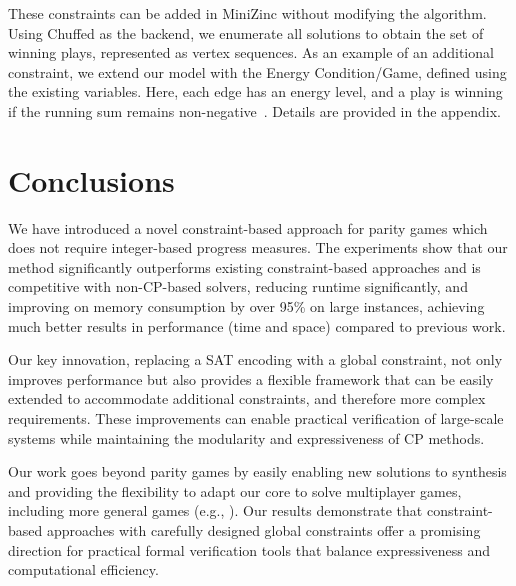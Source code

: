 \documentclass[letterpaper]{article} %
\begin{document}
These constraints can be added in MiniZinc without modifying the \noc algorithm. Using Chuffed as the backend, we enumerate all solutions to obtain the set of winning plays, represented as vertex sequences. As an example of an additional constraint, we extend our model with the Energy Condition/Game, defined using the existing variables. Here, each edge has an energy level, and a play is winning if the running sum remains non-negative~\cite{Chatterjee:2010}. Details are provided in the appendix.

\section{Conclusions}
We have introduced a novel constraint-based approach for parity games which does not require integer-based progress measures. The experiments show that our method significantly outperforms existing constraint-based approaches and is competitive with non-CP-based solvers, reducing runtime significantly, and improving on memory consumption by over 95\% on large instances, achieving much better results in performance (time and space) compared to previous work. 

Our key innovation, replacing a SAT encoding with a global constraint, not only improves performance but also provides a flexible framework that can be easily extended to accommodate additional constraints, and therefore more complex requirements.  These improvements can enable practical verification of large-scale systems while maintaining the modularity and expressiveness of CP methods.

Our work goes beyond parity games by easily enabling new solutions to synthesis and providing the flexibility to adapt our core to solve multiplayer games, including more general games (e.g.,  \wregulargames \cite{Chatterjee:2012}). Our results demonstrate that constraint-based approaches with carefully designed global constraints offer a promising direction for practical formal verification tools that balance expressiveness and computational efficiency.




\newpage

\end{document}

